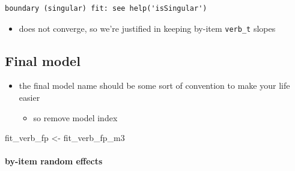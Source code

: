 \documentclass[
  letterpaper,
  DIV=11,
  numbers=noendperiod]{scrartcl}
\let\oldparagraph\paragraph
\renewcommand{\paragraph}[1]{\oldparagraph{#1}\mbox{}}
\newenvironment{Shaded}{\begin{snugshade}}{\end{snugshade}}
\newcommand{\FunctionTok}[1]{\textcolor[rgb]{0.28,0.35,0.67}{#1}}
\newcommand{\NormalTok}[1]{\textcolor[rgb]{0.00,0.23,0.31}{#1}}
\newcommand{\OtherTok}[1]{\textcolor[rgb]{0.00,0.23,0.31}{#1}}
\newcommand{\SpecialCharTok}[1]{\textcolor[rgb]{0.37,0.37,0.37}{#1}}
\providecommand{\tightlist}{%
  \setlength{\itemsep}{0pt}\setlength{\parskip}{0pt}}\usepackage{longtable,booktabs,array}
\begin{document}
\begin{verbatim}
boundary (singular) fit: see help('isSingular')
\end{verbatim}

\begin{itemize}
\tightlist
\item
  does not converge, so we're justified in keeping by-item
  \texttt{verb\_t} slopes
\end{itemize}

\hypertarget{final-model}{%
\subsection{Final model}\label{final-model}}

\begin{itemize}
\tightlist
\item
  the final model name should be some sort of convention to make your
  life easier

  \begin{itemize}
  \tightlist
  \item
    so remove model index
  \end{itemize}
\end{itemize}

\begin{Shaded}
\begin{Highlighting}[]
\NormalTok{fit\_verb\_fp }\OtherTok{\textless{}{-}}\NormalTok{ fit\_verb\_fp\_m3}
\end{Highlighting}
\end{Shaded}

\hypertarget{by-item-random-effects-2}{%
\paragraph{by-item random effects}\label{by-item-random-effects-2}}

\begin{Shaded}
\end{Shaded}
\end{document}
